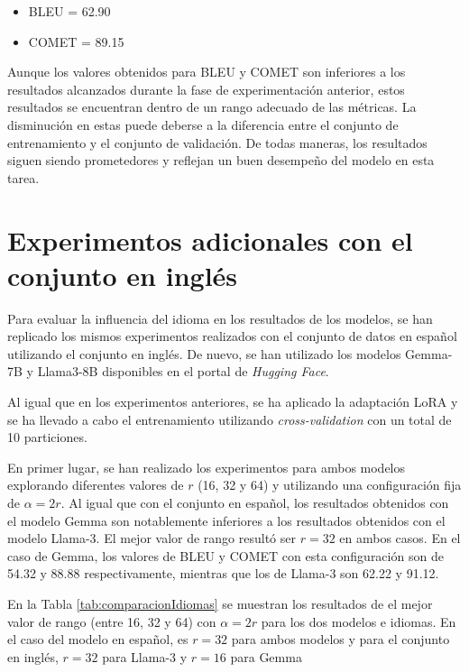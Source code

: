 \documentclass[11pt,spanish,listoffigures,listoftables]{tfgetsinf}
\begin{document}
\begin{itemize}
	\item BLEU = 62.90
	\item COMET = 89.15
\end{itemize}

Aunque los valores obtenidos para BLEU y COMET son inferiores a los resultados alcanzados durante la fase de experimentación anterior, estos resultados se encuentran dentro de un rango adecuado de las métricas. La disminución en estas puede deberse a la diferencia entre el conjunto de entrenamiento y el conjunto de validación. De todas maneras, los resultados siguen siendo prometedores y reflejan un buen desempeño del modelo en esta tarea.

\section{Experimentos adicionales con el conjunto en inglés}

Para evaluar la influencia del idioma en los resultados de los modelos, se han replicado los mismos experimentos realizados con el conjunto de datos en español utilizando el conjunto en inglés. De nuevo, se han utilizado los modelos Gemma-7B y Llama3-8B disponibles en el portal de \textit{Hugging Face}.

Al igual que en los experimentos anteriores, se ha aplicado la adaptación LoRA y se ha llevado a cabo el entrenamiento utilizando \textit{cross-validation} con un total de 10 particiones.

En primer lugar, se han realizado los experimentos para ambos modelos explorando diferentes valores de $r$ (16, 32 y 64) y utilizando una configuración  fija de $\alpha = 2r$. Al igual que con el conjunto en español, los resultados obtenidos con el modelo Gemma son notablemente inferiores a los resultados obtenidos con el modelo Llama-3. El mejor valor de rango resultó ser $r = 32$ en ambos casos. En el caso de Gemma, los valores de BLEU y COMET con esta configuración son de 54.32 y 88.88 respectivamente, mientras que los de Llama-3 son 62.22 y 91.12.

En la Tabla \ref{tab:comparacionIdiomas} se muestran los resultados de el mejor valor de rango (entre 16, 32 y 64) con $\alpha = 2r$ para los dos modelos e idiomas. En el caso del modelo en español, es $r = 32$ para ambos modelos y para el conjunto en inglés, $r = 32$ para Llama-3 y $r = 16$ para Gemma
\end{document}
